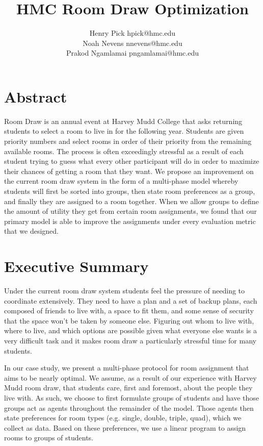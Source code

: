 \documentclass[12pt]{article}
\author{Henry Pick \small hpick@hmc.edu \\
\large Noah Nevens \small nnevens@hmc.edu \\
\large Prakod Ngamlamai \small pngamlamai@hmc.edu}
\title{HMC Room Draw Optimization}
\begin{document}
    \maketitle
    \section*{Abstract}
    Room Draw is an annual event at Harvey Mudd College that asks returning students to select a room to live in for the following year. Students are given priority numbers and select rooms in order of their priority from the remaining available rooms. The process is often exceedingly stressful as a result of each student trying to guess what every other participant will do in order to maximize their chances of getting a room that they want. We propose an improvement on the current room draw system in the form of a multi-phase model whereby students will first be sorted into groups, then state room preferences as a group, and finally they are assigned to a room together. When we allow groups to define the amount of utility they get from certain room assignments, we found that our primary model is able to improve the assignments under every evaluation metric that we designed.
    \section*{Executive Summary}
    Under the current room draw system students feel the pressure of needing to coordinate extensively. They need to have a plan and a set of backup plans, each composed of friends to live with, a space to fit them, and some sense of security that the space won't be taken by someone else. Figuring out whom to live with, where to live, and which options are possible given what everyone else wants is a very difficult task and it makes room draw a particularly stressful time for many students. 
    
    In our case study, we present a multi-phase protocol for room assignment that aims to be nearly optimal. We assume, as a result of our experience with Harvey Mudd room draw, that students care, first and foremost, about the people they live with. As such, we choose to first formulate groups of students and have those groups act as agents throughout the remainder of the model. Those agents then state preferences for room types (e.g. single, double, triple, quad), which we collect as data. Based on these preferences, we use a linear program to assign rooms to groups of students. 
\end{document}
